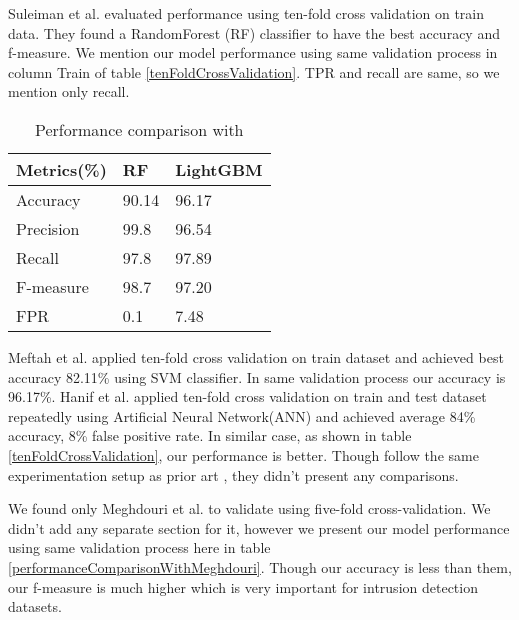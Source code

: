 \documentclass[14pt, conference]{IEEEtran}
\begin{document}
Suleiman et al. \cite{suleiman2018performance} evaluated performance using ten-fold cross validation on train data. They found a RandomForest (RF) classifier to have the best accuracy and f-measure. We mention our model performance using same validation process in column Train of table \ref{tenFoldCrossValidation}. TPR and recall are same, so we mention only recall.
\begin{table}[H]
\normalsize
\centering
\caption{Performance comparison with \cite{suleiman2018performance}}
\label{performanceComparisonWithSuleiman}
\renewcommand{\arraystretch}{1.2}
\begin{tabular}{|C{2.3cm}|C{2.2cm}|C{2.2cm}|}
\hline
\textbf{Metrics(\%)} & \textbf{RF \cite{suleiman2018performance}} & \textbf{LightGBM} \\ \hline
Accuracy & 90.14 & 96.17\\ \hline
Precision  & 99.8 & 96.54\\ \hline
Recall  & 97.8 & 97.89\\ \hline
F-measure  & 98.7 & 97.20\\ \hline
FPR  & 0.1 & 7.48\\ \hline
\end{tabular}
\end{table}

Meftah et al. \cite{meftah2019network} applied ten-fold cross validation on train dataset and achieved best accuracy 82.11\% using SVM classifier. In same validation process our accuracy is 96.17\%. Hanif et al. \cite{hanif2019intrusion} applied ten-fold cross validation on train and test dataset repeatedly using Artificial Neural Network(ANN) and achieved average 84\% accuracy, 8\% false positive rate. In similar case, as shown in table \ref{tenFoldCrossValidation}, our performance is better. Though \cite{meftah2019network}\cite{hanif2019intrusion} follow the same experimentation setup as prior art \cite{suleiman2018performance}, they didn't present any comparisons. 

We found only Meghdouri et al. \cite{meghdouri2018analysis} to validate using five-fold cross-validation. We didn't add any separate section for it, however we present our model performance using same validation process here in table \ref{performanceComparisonWithMeghdouri}. Though our accuracy is less than them, our f-measure is much higher which is very important for intrusion detection datasets. 
\end{document}
